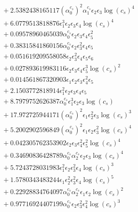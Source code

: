 \documentclass[10pt]{article}
\begin{document}
\begin{align*}
&{}  + 2.5382438165117 \left(\alpha_{0}^{c_s}\right)^{2} \alpha_{1}^{c_s} \epsilon_{2} \epsilon_{3} \log{\left(c_{s} \right)}^{4} \\
&{}  + 6.0779513818876 \epsilon_{1}^{3} \epsilon_{2} \epsilon_{3} \epsilon_{4} \log{\left(c_{s} \right)}^{4} \\
&{}  + 0.09578960465039 \alpha_{0}^{c_s} \epsilon_{2} \epsilon_{3} \epsilon_{4} \epsilon_{5}^{2} \\
&{}  + 0.38315841860156 \alpha_{0}^{c_s} \epsilon_{2} \epsilon_{3}^{2} \epsilon_{4} \epsilon_{5} \\
&{}  + 0.051619209558058 \epsilon_{2} \epsilon_{3}^{2} \epsilon_{4} \epsilon_{5} \epsilon_{6} \\
&{}  + 0.027893619983116 \epsilon_{2} \epsilon_{3} \epsilon_{4} \epsilon_{5}^{3} \log{\left(c_{s} \right)}^{2} \\
&{}  + 0.014561867320903 \epsilon_{1} \epsilon_{2} \epsilon_{3} \epsilon_{4}^{2} \epsilon_{5} \\
&{}  + 2.1503772818914 \epsilon_{1}^{2} \epsilon_{2} \epsilon_{3} \epsilon_{4} \epsilon_{5} \\
&{}  + 8.7979752626387 \alpha_{0}^{c_s} \epsilon_{1}^{3} \epsilon_{2} \epsilon_{3} \log{\left(c_{s} \right)} \\
&{}  + 17.972725944171 \left(\alpha_{0}^{c_s}\right)^{2} \epsilon_{1} \epsilon_{2}^{2} \epsilon_{3} \log{\left(c_{s} \right)}^{3} \\
&{}  + 5.2002902596849 \left(\alpha_{0}^{c_s}\right)^{2} \epsilon_{1} \epsilon_{2} \epsilon_{3}^{2} \log{\left(c_{s} \right)}^{4} \\
&{}  + 0.042305762353902 \epsilon_{2} \epsilon_{3} \epsilon_{4}^{2} \epsilon_{5}^{2} \log{\left(c_{s} \right)}^{4} \\
&{}  + 0.34690836428789 \alpha_{0}^{c_s} \alpha_{2}^{c_s} \epsilon_{2} \epsilon_{3} \log{\left(c_{s} \right)}^{4} \\
&{}  + 5.7243728031983 \epsilon_{1}^{2} \epsilon_{2} \epsilon_{3}^{2} \epsilon_{4} \log{\left(c_{s} \right)}^{3} \\
&{}  + 1.5780343483244 \epsilon_{1} \epsilon_{2}^{2} \epsilon_{3}^{2} \epsilon_{4} \log{\left(c_{s} \right)}^{5} \\
&{}  + 0.22928834764097 \alpha_{0}^{c_s} \alpha_{2}^{c_s} \epsilon_{1} \epsilon_{2} \log{\left(c_{s} \right)}^{2} \\
&{}  + 0.97716924407199 \alpha_{0}^{c_s} \epsilon_{2} \epsilon_{3}^{2} \epsilon_{4}^{2} \log{\left(c_{s} \right)}^{3} \\

\end{align*}
\end{document}
